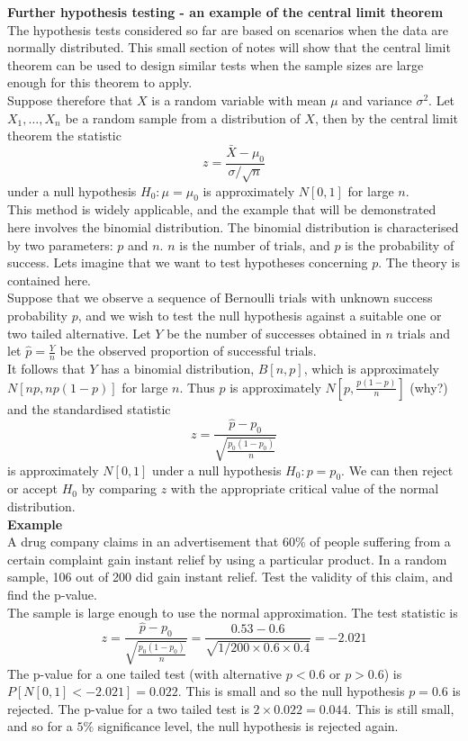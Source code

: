 \documentclass[12pt]{article}
\begin{document}
\nonumber
\textbf{Further hypothesis testing - an example of the central limit theorem}\\

The hypothesis tests considered so far are based on scenarios when the data are normally distributed. This small section of notes will show that the central limit theorem can be used to design similar tests when the sample sizes are large enough for this theorem to apply.\\

Suppose therefore that $X$ is a random variable with mean $\mu$ and variance $\sigma^{2}$. Let $X_{1},\ldots,X_{n}$ be a random sample from a distribution of $X$, then by the central limit theorem the statistic $$z=\frac{\bar{X}-\mu_{0}}{\sigma/\sqrt{n}}$$ under a null hypothesis $H_{0}:\mu=\mu_{0}$ is approximately $N[0,1]$ for large $n$.\\

This method is widely applicable, and the example that will be demonstrated here involves the binomial distribution. The binomial distribution is characterised by two parameters: $p$ and $n$. $n$ is the number of trials, and $p$ is the probability of success. Lets imagine that we want to test hypotheses concerning $p$. The theory is contained here.\\

Suppose that we observe a sequence of Bernoulli trials with unknown success probability $p$, and we wish to test the null hypothesis against a suitable one or two tailed alternative. Let $Y$ be the number of successes obtained in $n$ trials and let $\hat{p}=\frac{Y}{n}$ be the observed proportion of successful trials.\\

It follows that $Y$ has a binomial distribution, $B[n,p]$, which is approximately $N[np,np(1-p)]$ for large $n$. Thus $\hat{p}$ is approximately $N[p,\frac{p(1-p)}{n}]$ (why?) and the standardised statistic $$z=\frac{\hat{p}-p_0}{\sqrt{\frac{p_0(1-p_0)}{n}}}$$ is approximately $N[0,1]$ under a null hypothesis $H_{0}:p=p_0$. We can then reject or accept $H_{0}$ by comparing $z$ with the appropriate critical value of the normal distribution.\\

\textbf{Example}\\
A drug company claims in an advertisement that $60\%$ of people suffering from a certain complaint gain instant relief by using a particular product. In a random sample, 106 out of 200 did gain instant relief. Test the validity of this claim, and find the p-value.\\

The sample is large enough to use the normal approximation. The test statistic is $$z=\frac{\hat{p}-p_0}{\sqrt{\frac{p_0(1-p_0)}{n}}}=\frac{0.53-0.6}{\sqrt{1/200 \times 0.6 \times 0.4}}=-2.021$$
The p-value for a one tailed test (with alternative $p<0.6$ or $p>0.6$) is $P[N[0,1]<-2.021]=0.022$. This is small and so the null hypothesis $p=0.6$ is rejected. The p-value for a two tailed test is $2 \times 0.022=0.044$. This is still small, and so for a $5\%$ significance level, the null hypothesis is rejected again.
\end{document}
